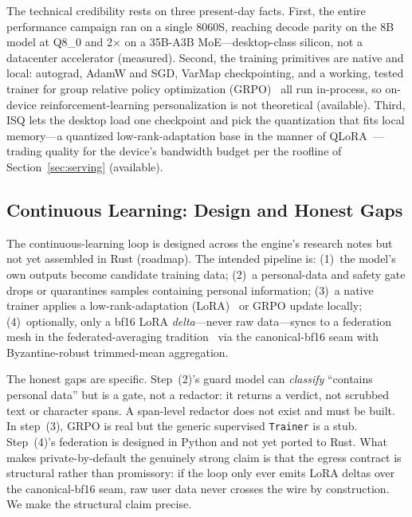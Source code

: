 \documentclass[11pt]{article}
\begin{document}
The technical credibility rests on three present-day facts. First, the entire performance campaign ran on a single 8060S, reaching decode parity on the 8B model at Q8\_0 and 2$\times$ on a 35B-A3B MoE---desktop-class silicon, not a datacenter accelerator (measured). Second, the training primitives are native and local: autograd, AdamW and SGD, VarMap checkpointing, and a working, tested trainer for group relative policy optimization (GRPO)~\cite{shahul2024} all run in-process, so on-device reinforcement-learning personalization is not theoretical (available). Third, ISQ lets the desktop load one checkpoint and pick the quantization that fits local memory---a quantized low-rank-adaptation base in the manner of QLoRA~\cite{dettmers2023}---trading quality for the device's bandwidth budget per the roofline of Section~\ref{sec:serving} (available).

\subsection{Continuous Learning: Design and Honest Gaps}

The continuous-learning loop is designed across the engine's research notes but not yet assembled in Rust (roadmap). The intended pipeline is: (1)~the model's own outputs become candidate training data; (2)~a personal-data and safety gate drops or quarantines samples containing personal information; (3)~a native trainer applies a low-rank-adaptation (LoRA)~\cite{hu2022} or GRPO update locally; (4)~optionally, only a bf16 LoRA \emph{delta}---never raw data---syncs to a federation mesh in the federated-averaging tradition~\cite{mcmahan2017} via the canonical-bf16 seam with Byzantine-robust trimmed-mean aggregation.

The honest gaps are specific. Step~(2)'s guard model can \emph{classify} ``contains personal data'' but is a gate, not a redactor: it returns a verdict, not scrubbed text or character spans. A span-level redactor does not exist and must be built. In step~(3), GRPO is real but the generic supervised \texttt{Trainer} is a stub. Step~(4)'s federation is designed in Python and not yet ported to Rust. What makes private-by-default the genuinely strong claim is that the egress contract is structural rather than promissory: if the loop only ever emits LoRA deltas over the canonical-bf16 seam, raw user data never crosses the wire by construction. We make the structural claim precise.
\end{document}
